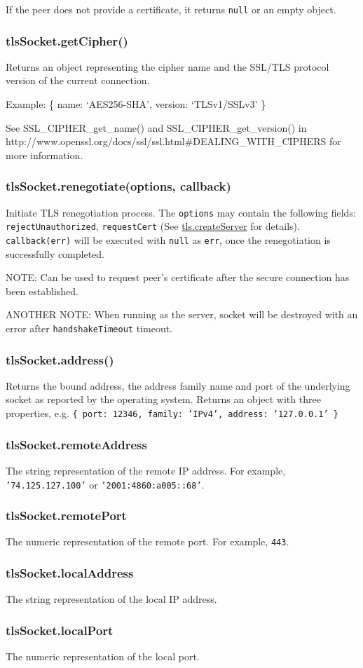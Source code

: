 If the peer does not provide a certificate, it returns \texttt{null} or
an empty object.

\subsubsection{tlsSocket.getCipher()}

Returns an object representing the cipher name and the SSL/TLS protocol
version of the current connection.

Example: \{ name: `AES256-SHA', version: `TLSv1/SSLv3' \}

See SSL\_CIPHER\_get\_name() and SSL\_CIPHER\_get\_version() in
http://www.openssl.org/docs/ssl/ssl.html\#DEALING\_WITH\_CIPHERS for
more information.

\subsubsection{tlsSocket.renegotiate(options, callback)}

Initiate TLS renegotiation process. The \texttt{options} may contain the
following fields: \texttt{rejectUnauthorized}, \texttt{requestCert} (See
\hyperref[tls\_tls\_createserver\_options\_secureconnectionlistener]{tls.createServer}
for details). \texttt{callback(err)} will be executed with \texttt{null}
as \texttt{err}, once the renegotiation is successfully completed.

NOTE: Can be used to request peer's certificate after the secure
connection has been established.

ANOTHER NOTE: When running as the server, socket will be destroyed with
an error after \texttt{handshakeTimeout} timeout.

\subsubsection{tlsSocket.address()}

Returns the bound address, the address family name and port of the
underlying socket as reported by the operating system. Returns an object
with three properties, e.g.
\texttt{\{ port: 12346, family: 'IPv4', address: '127.0.0.1' \}}

\subsubsection{tlsSocket.remoteAddress}

The string representation of the remote IP address. For example,
\texttt{'74.125.127.100'} or \texttt{'2001:4860:a005::68'}.

\subsubsection{tlsSocket.remotePort}

The numeric representation of the remote port. For example,
\texttt{443}.

\subsubsection{tlsSocket.localAddress}

The string representation of the local IP address.

\subsubsection{tlsSocket.localPort}

The numeric representation of the local port.
